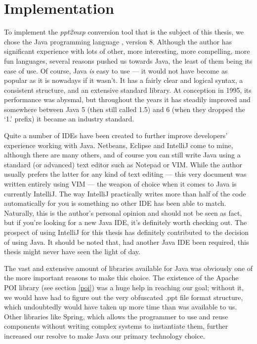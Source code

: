 
 \chapter{Implementation}
  \label{implementation}

  To implement the \emph{ppt2mxp} conversion tool that is the subject of this
  thesis, we chose the Java programming language \citep{gosling-1}, version 8.
  Although the author has significant experience with lots of other, more
  interesting, more compelling, more fun languages, several reasons pushed us
  towards Java, the least of them being its ease of use. Of course, Java
  \emph{is} easy to use --- it would not have become as popular as it is
  nowadays if it wasn't. It has a fairly clear and logical syntax, a consistent
  structure, and an extensive standard library. At conception in 1995, its
  performance was abysmal, but throughout the years it has steadily improved
  and somewhere between Java 5 (then still called 1.5) and 6 (when they dropped
  the `1.' prefix) it became an industry standard.

  Quite a number of IDEs have been created to further improve developers'
  experience working with Java. Netbeans, Eclipse and IntelliJ come to mine,
  although there are many others, and of course you can still write Java using
  a standard (or advanced) text editor such as Notepad or VIM. While the author
  usually prefers the latter for any kind of text editing --- this very
  document was written entirely using VIM --- the weapon of choice when it
  comes to Java is currently IntelliJ. The way IntelliJ practically writes more
  than half of the code automatically for you is something no other IDE has
  been able to match. Naturally, this is the author's personal opinion and
  should not be seen as fact, but if you're looking for a new Java IDE, it's
  definitely worth checking out. The prospect of using IntelliJ for this thesis
  has definitely contributed to the decision of using Java. It should be noted
  that, had another Java IDE been required, this thesis might never have seen
  the light of day.

  The vast and extensive amount of libraries available for Java was obviously
  one of the more important reasons to make this choice. The existence of the
  Apache POI library (see section \ref{poi}) was a huge help in reaching our
  goal; without it, we would have had to figure out the very obfuscated .ppt
  file format structure, which undoubtedly would have taken up more time than
  was available to us. Other libraries like Spring, which allows the programmer
  to use and reuse components without writing complex systems to instantiate
  them, further increased our resolve to make Java our primary technology
  choice.

